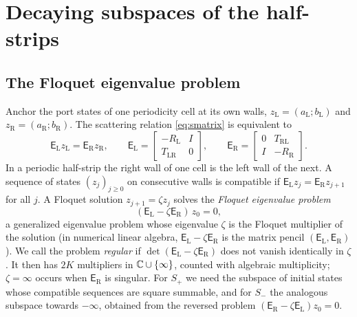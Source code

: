 \section{Decaying subspaces of the half-strips}\label{sec:leads}

\subsection{The Floquet eigenvalue problem}\label{sec:pencil}
Anchor the port states of one periodicity cell at its own walls,
$z_{\mathrm L}=(a_{\mathrm L};b_{\mathrm L})$ and $z_{\mathrm R}=(a_{\mathrm R};b_{\mathrm R})$.
The scattering relation \eqref{eq:smatrix} is equivalent to
\begin{equation}\label{eq:pencil}
  \mathsf E_{\mathrm L}z_{\mathrm L}=\mathsf E_{\mathrm R}z_{\mathrm R},\qquad
  \mathsf E_{\mathrm L}=\begin{bmatrix}-R_{\mathrm L}&I\\ T_{\mathrm{LR}}&0\end{bmatrix},\qquad
  \mathsf E_{\mathrm R}=\begin{bmatrix}0&T_{\mathrm{RL}}\\ I&-R_{\mathrm R}\end{bmatrix}.
\end{equation}
In a periodic half-strip the right wall of one cell is the left wall of the
next.
A sequence of states $(z_j)_{j\ge0}$ on consecutive walls is compatible if
$\mathsf E_{\mathrm L}z_j=\mathsf E_{\mathrm R}z_{j+1}$ for all $j$. A Floquet
solution $z_{j+1}=\zeta z_j$ solves the \emph{Floquet eigenvalue problem}
\begin{equation}\label{eq:floquet}
  (\mathsf E_{\mathrm L}-\zeta\mathsf E_{\mathrm R})\,z_0=0,
\end{equation}
a generalized eigenvalue problem whose eigenvalue $\zeta$ is the Floquet
multiplier of the solution (in numerical linear algebra,
$\mathsf E_{\mathrm L}-\zeta\mathsf E_{\mathrm R}$ is the matrix pencil
$(\mathsf E_{\mathrm L},\mathsf E_{\mathrm R})$). We call the problem \emph{regular} if
$\det(\mathsf E_{\mathrm L}-\zeta\mathsf E_{\mathrm R})$ does not vanish identically in
$\zeta$. It then has $2K$ multipliers in $\mathbb{C}\cup\{\infty\}$, counted with
algebraic multiplicity; $\zeta=\infty$ occurs when $\mathsf E_{\mathrm R}$ is singular. For $S_+$ we need the subspace of initial states whose
compatible sequences are square summable, and for $S_-$ the
analogous subspace towards $-\infty$, obtained from the reversed problem
$(\mathsf E_{\mathrm R}-\zeta\mathsf E_{\mathrm L})z_0=0$.

